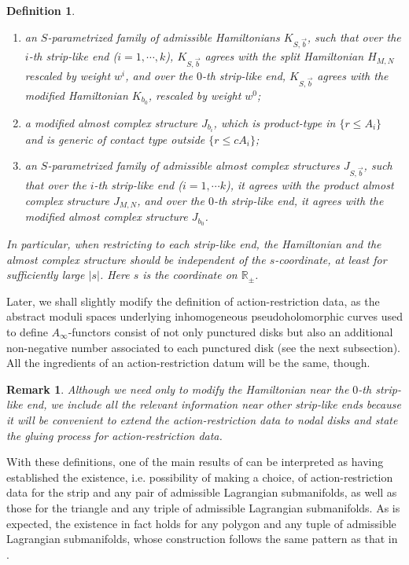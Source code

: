 \documentclass{amsart}
\newtheorem{definition}[theorem]{Definition}
\newtheorem{remark}[theorem]{Remark}
\numberwithin{equation}{section}
\numberwithin{figure}{section}
\begin{document}
\begin{definition}
\begin{enumerate}[label=(\roman*)]
\item an $S$-parametrized family of admissible Hamiltonians $K_{S, \vec{b}}$, such that over the $i$-th strip-like end ($i=1, \cdots, k$), $K_{S, \vec{b}}$ agrees with the split Hamiltonian $H_{M, N}$ rescaled by weight $w^{i}$, and over the $0$-th strip-like end, $K_{S, \vec{b}}$ agrees with the modified Hamiltonian $K_{b_{0}}$, rescaled by weight $w^{0}$;

\item a modified almost complex structure $J_{b_{i}}$, which is product-type in $\{r \le A_{i}\}$ and is generic of contact type outside $\{r \le cA_{i}\}$;

\item an $S$-parametrized family of admissible almost complex structures $J_{S, \vec{b}}$, such that over the $i$-th strip-like end ($i=1, \cdots k$), it agrees with the product almost complex structure $J_{M, N}$, and over the $0$-th strip-like end, it agrees with the modified almost complex structure $J_{b_{0}}$.

\end{enumerate}
In particular, when restricting to each strip-like end, the Hamiltonian and the almost complex structure should be independent of the $s$-coordinate, at least for sufficiently large $|s|$. Here $s$ is the coordinate on $\mathbb{R}_{\pm}$.
\end{definition}

	Later, we shall slightly modify the definition of action-restriction data, as the abstract moduli spaces underlying inhomogeneous pseudoholomorphic curves used to define $A_{\infty}$-functors consist of not only punctured disks but also an additional non-negative number associated to each punctured disk (see the next subsection). All the ingredients of an action-restriction datum will be the same, though. \par

\begin{remark}
	Although we need only to modify the Hamiltonian near the $0$-th strip-like end, we include all the relevant information near other strip-like ends because it will be convenient to extend the action-restriction data to nodal disks and state the gluing process for action-restriction data.
\end{remark}

	With these definitions, one of the main results of \cite{Gao1} can be interpreted as having established the existence, i.e. possibility of making a choice, of action-restriction data for the strip and any pair of admissible Lagrangian submanifolds, as well as those for the triangle and any triple of admissible Lagrangian submanifolds. As is expected, the existence in fact holds for any polygon and any tuple of admissible Lagrangian submanifolds, whose construction follows the same pattern as that in \cite{Gao1}. \par
\end{document}
